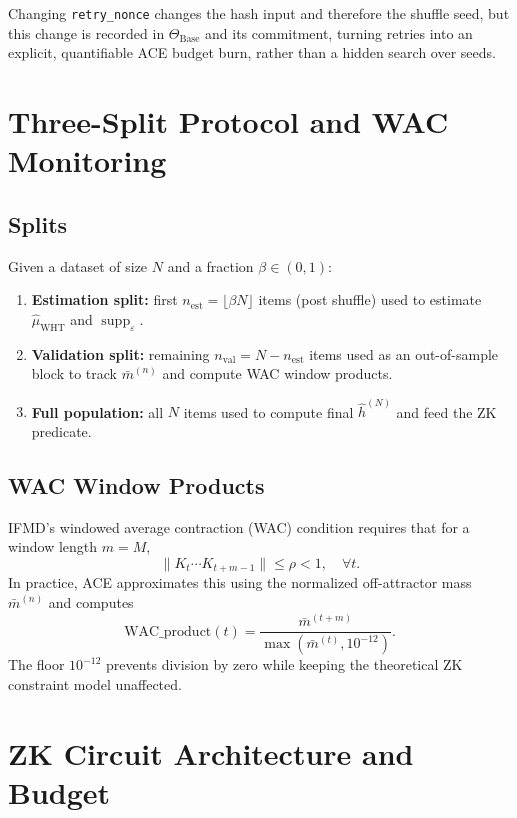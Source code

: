 \documentclass[11pt]{article}
\begin{document}
Changing \texttt{retry\_nonce} changes the hash input and therefore the shuffle seed, but this change is recorded in $\Theta_{\text{Base}}$ and its commitment, turning retries into an explicit, quantifiable ACE budget burn, rather than a hidden search over seeds.

\section{Three-Split Protocol and WAC Monitoring}

\subsection{Splits}

Given a dataset of size $N$ and a fraction $\beta \in (0,1)$:

\begin{enumerate}[nosep]
  \item \textbf{Estimation split:} first $n_{\text{est}} = \lfloor \beta N \rfloor$ items (post shuffle) used to estimate $\hat{\mu}_{\text{WHT}}$ and $\operatorname{supp}_\varepsilon$.
  \item \textbf{Validation split:} remaining $n_{\text{val}} = N - n_{\text{est}}$ items used as an out-of-sample block to track $\bar{m}^{(n)}$ and compute WAC window products.
  \item \textbf{Full population:} all $N$ items used to compute final $\hat{h}^{(N)}$ and feed the ZK predicate.
\end{enumerate}

\subsection{WAC Window Products}

IFMD's windowed average contraction (WAC) condition requires that for a window length $m = M$,
\[
\|K_t \cdots K_{t+m-1}\| \le \rho < 1, \quad \forall t.
\]
In practice, ACE approximates this using the normalized off-attractor mass $\bar{m}^{(n)}$ and computes
\[
\text{WAC\_product}(t) = \frac{\bar{m}^{(t+m)}}{\max(\bar{m}^{(t)}, 10^{-12})}.
\]
The floor $10^{-12}$ prevents division by zero while keeping the theoretical ZK constraint model unaffected.

\section{ZK Circuit Architecture and Budget}
\end{document}
